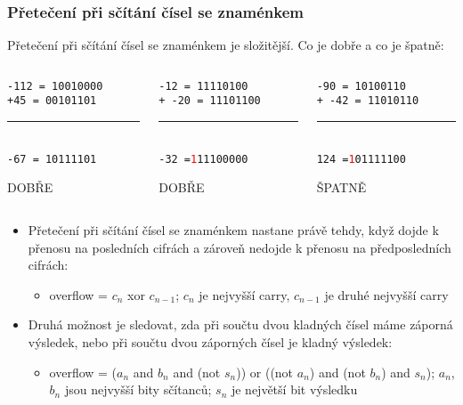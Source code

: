 \documentclass{beamer}
\begin{document}
\begin{frame}
\frametitle{Přetečení při sčítání čísel se znaménkem}

Přetečení při sčítání čísel se znaménkem je složitější. Co je dobře a co je špatně:
\bigskip
\begin{columns}
\begin{column}{0.3\textwidth}
\texttt{-112 = 10010000}\\
\texttt{+\phantom{x}45 = 00101101}\\
\vspace{-8pt}
\rule[0pt]{3cm}{0.1pt}\\
\texttt{\phantom{x}-67 = 10111101}\\
\begin{center}
\large DOBŘE
\end{center}
\end{column}
\hfill
\begin{column}{0.3\textwidth}
\texttt{\phantom{xx}-12 = 11110100}\\
\texttt{+ -20 = 11101100}\\
\vspace{-8pt}
\rule[0pt]{3cm}{0.1pt}\\
\texttt{\phantom{xx}-32 =\textcolor{red}{1}11100000}\\
\begin{center}
\large DOBŘE
\end{center}
\end{column}
\hfill
\begin{column}{0.3\textwidth}
\texttt{\phantom{xx}-90 = 10100110}\\
\texttt{+ -42 = 11010110}\\
\vspace{-8pt}
\rule[0pt]{3cm}{0.1pt}\\
\texttt{\phantom{xx}124 =\textcolor{red}{1}01111100}\\
\begin{center}
\large ŠPATNĚ
\end{center}
\end{column}
\end{columns}
\bigskip
\begin{itemize}
\item Přetečení při sčítání čísel se znaménkem nastane právě tehdy, když dojde k přenosu na posledních cifrách a zároveň nedojde k přenosu na předposledních cifrách:
\begin{itemize}
\item overflow = $c_n$ xor $c_{n-1}$; $c_n$ je nejvyšší carry, $c_{n-1}$ je druhé nejvyšší carry
\end{itemize}
\item Druhá možnost je sledovat, zda při součtu dvou kladných čísel máme záporná výsledek, nebo při součtu dvou záporných čísel je kladný výsledek:
\begin{itemize}
\item overflow = ($a_n$ and  $b_n$ and (not $s_n$)) or ((not $a_n$) and  (not $b_n$) and $s_n$); $a_n$, $b_n$ jsou nejvyšší bity sčítanců; $s_n$ je největší bit výsledku
\end{itemize}
\end{itemize}
\end{frame}
\end{document}

